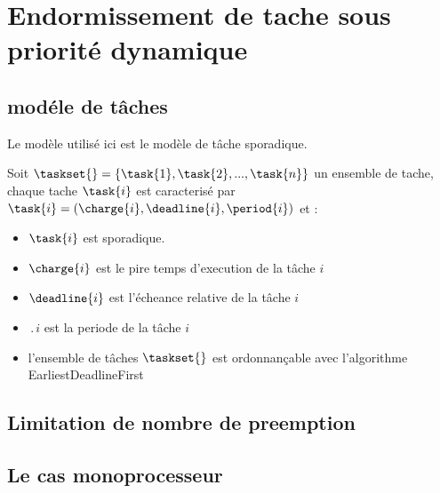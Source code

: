 \chapter{Endormissement de tache sous priorité dynamique}
\minitoc
\section{modéle de tâches}
Le modèle utilisé ici est le modèle de tâche sporadique.

Soit $\taskset{} = \{\task{1},\task{2},...,\task{n}\}$ un ensemble de
tache, chaque tache $\task{i}$ est caracterisé par $\task{i} =
(\charge{i},\deadline{i},\period{i})$ et :

\begin{itemize}
\item $\task{i}$ est sporadique.
\item $\charge{i}$ est le pire temps d'execution de la t\^ache $i$
\item $\deadline{i}$ est l'écheance relative de la t\^ache $i$
\item $\period{i}$ est la periode de la t\^ache $i$
\item l'ensemble de tâches $\taskset{}$ est ordonnançable avec l'algorithme EarliestDeadlineFirst
\end{itemize}

\section{Limitation de nombre de preemption}


\section{Le cas monoprocesseur}
%


